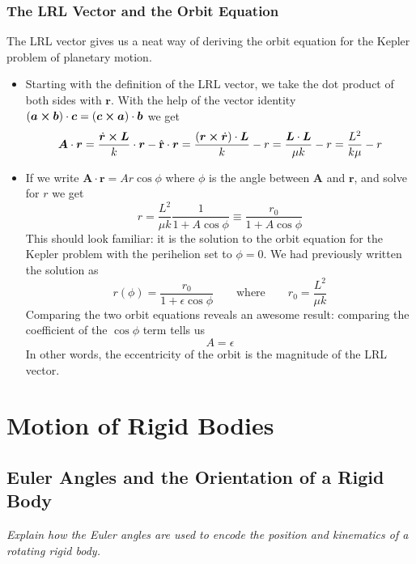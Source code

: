 \documentclass[11pt, a4paper]{article}
\newcommand{\eqtext}[1]{\qquad \text{#1} \qquad}
\newcommand{\uvec}[1]{\hat{\mathbf{#1}}}
\newcommand{\bdot}[1]{\dot{\bm{#1}}}
\begin{document}
\subsubsection{The LRL Vector and the Orbit Equation}
The LRL vector gives us a neat way of deriving the orbit equation for the Kepler problem of planetary motion.
\begin{itemize}
	\item Starting with the definition of the LRL vector, we take the dot product of both sides with $ \bm{r} $. With the help of the vector identity $ (\bm{a} \cross \bm{b}) \cdot \bm{c} = (\bm{c} \cross \bm{a}) \cdot \bm{b}$ we get
	\begin{equation*}
		\bm{A}\cdot\bm{r} =  \frac{\bdot{r} \cross \bm{L}}{k}\cdot\bm{r} - \uvec{r} \cdot\bm{r} = \frac{(\bm{r} \cross \bdot{r})\cdot\bm{L}}{k} - r = \frac{\bm{L}\cdot\bm{L}}{\mu k} - r = \frac{L^{2}}{k \mu} - r
	\end{equation*}
	
	\item If we write $ \bm{A} \cdot \bm{r} = A r \cos \phi $ where $ \phi $ is the angle between $ \bm{A} $ and $ \bm{r} $, and solve for $ r $ we get
	\begin{equation*}
		r = \frac{L^{2}}{\mu k}\frac{1}{1 + A \cos \phi} \equiv \frac{r_{0}}{1 + A \cos \phi} 
	\end{equation*}
	This should look familiar: it is the solution to the orbit equation for the Kepler problem with the perihelion set to $ \phi = 0 $. We had previously written the solution as
	\begin{equation*}
		r(\phi) = \frac{r_{0}}{1 + \epsilon \cos \phi} \eqtext{where} r_{0} = \frac{L^{2}}{\mu k}
	\end{equation*}
	Comparing the two orbit equations reveals an awesome result: comparing the coefficient of the $ \cos \phi $ term tells us
	\begin{equation*}
		A = \epsilon
	\end{equation*}
	In other words, the eccentricity of the orbit is the magnitude of the LRL vector.
\end{itemize}

\section{Motion of Rigid Bodies}

\subsection{Euler Angles and the Orientation of a Rigid Body}
\textit{Explain how the Euler angles are used to encode the position and kinematics of a rotating rigid body.}
\end{document}
